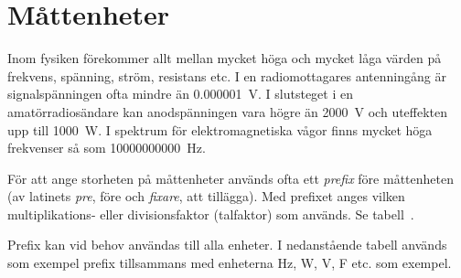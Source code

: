 \chapter{Måttenheter}

\noindent Inom fysiken förekommer allt mellan mycket höga och mycket
låga värden på frekvens, spänning, ström, resistans etc.
I en radiomottagares antenningång är signalspänningen ofta mindre än
\qty{0,000001}{\volt}.
I slutsteget i en amatörradiosändare kan anodspänningen vara högre än
\qty{2000}{\volt} och uteffekten upp till \qty{1000}{\watt}.
I spektrum för elektromagnetiska vågor finns mycket höga frekvenser så som
\qty{10000000000}{\hertz}.

För att ange storheten på måttenheter används ofta ett \emph{prefix}
före måttenheten (av latinets \emph{pre}, före och \emph{fixare}, att
tillägga).
Med prefixet anges vilken multiplikations- eller divisionsfaktor (talfaktor)
som används. Se tabell~.

Prefix kan vid behov användas till alla enheter.
I nedanstående tabell används som exempel prefix tillsammans med enheterna
\unit{\hertz}, \unit{\watt}, \unit{\volt}, \unit{\farad} etc. som exempel.


